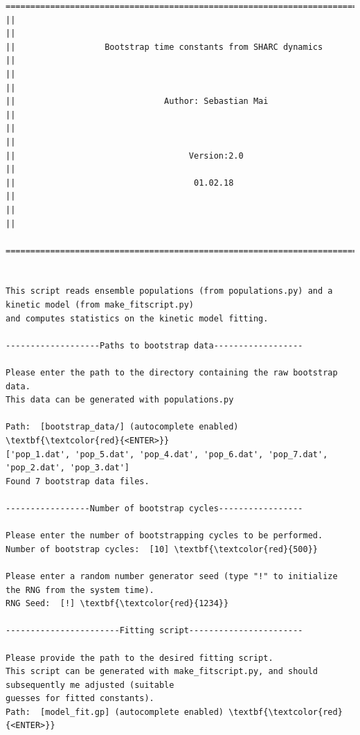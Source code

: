 \documentclass[a4paper,11pt,DIV=15,openany]{scrbook}
\begin{document}
\begin{oframed}
\footnotesize\begin{Verbatim}[commandchars=\\\{\}]
  ================================================================================
||                                                                                ||
||                  Bootstrap time constants from SHARC dynamics                  ||
||                                                                                ||
||                              Author: Sebastian Mai                             ||
||                                                                                ||
||                                   Version:2.0                                  ||
||                                    01.02.18                                    ||
||                                                                                ||
  ================================================================================


This script reads ensemble populations (from populations.py) and a kinetic model (from make_fitscript.py)
and computes statistics on the kinetic model fitting.
  
-------------------Paths to bootstrap data------------------

Please enter the path to the directory containing the raw bootstrap data.
This data can be generated with populations.py

Path:  [bootstrap_data/] (autocomplete enabled) \textbf{\textcolor{red}{<ENTER>}}
['pop_1.dat', 'pop_5.dat', 'pop_4.dat', 'pop_6.dat', 'pop_7.dat', 'pop_2.dat', 'pop_3.dat']
Found 7 bootstrap data files.

-----------------Number of bootstrap cycles-----------------

Please enter the number of bootstrapping cycles to be performed.
Number of bootstrap cycles:  [10] \textbf{\textcolor{red}{500}}

Please enter a random number generator seed (type "!" to initialize the RNG from the system time).
RNG Seed:  [!] \textbf{\textcolor{red}{1234}}

-----------------------Fitting script-----------------------

Please provide the path to the desired fitting script.
This script can be generated with make_fitscript.py, and should subsequently me adjusted (suitable 
guesses for fitted constants).
Path:  [model_fit.gp] (autocomplete enabled) \textbf{\textcolor{red}{<ENTER>}}


\end{Verbatim}
\end{oframed}
\end{document}
